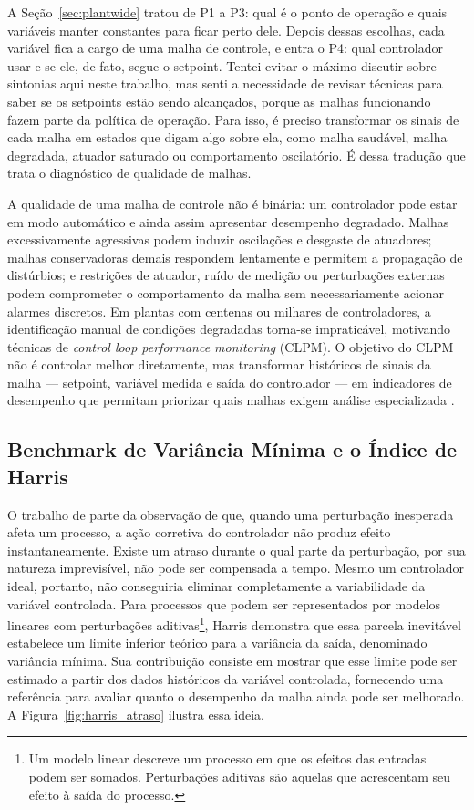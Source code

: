 A Seção~\ref{sec:plantwide} tratou de P1 a P3: qual é o ponto de operação e quais variáveis manter constantes para ficar perto dele. Depois dessas escolhas, cada variável fica a cargo de uma malha de controle, e entra o P4: qual controlador usar e se ele, de fato, segue o setpoint. Tentei evitar o máximo discutir sobre sintonias aqui neste trabalho, mas senti a necessidade de revisar técnicas para saber se os setpoints estão sendo alcançados, porque as malhas funcionando fazem parte da política de operação. Para isso, é preciso transformar os sinais de cada malha em estados que digam algo sobre ela, como malha saudável, malha degradada, atuador saturado ou comportamento oscilatório. É dessa tradução que trata o diagnóstico de qualidade de malhas.

A qualidade de uma malha de controle não é binária: um controlador pode estar em modo automático e ainda assim apresentar desempenho degradado. Malhas excessivamente agressivas podem induzir oscilações e desgaste de atuadores; malhas conservadoras demais respondem lentamente e permitem a propagação de distúrbios; e restrições de atuador, ruído de medição ou perturbações externas podem comprometer o comportamento da malha sem necessariamente acionar alarmes discretos. Em plantas com centenas ou milhares de controladores, a identificação manual de condições degradadas torna-se impraticável, motivando técnicas de \textit{control loop performance monitoring} (CLPM). O objetivo do CLPM não é controlar melhor diretamente, mas transformar históricos de sinais da malha --- setpoint, variável medida e saída do controlador --- em indicadores de desempenho que permitam priorizar quais malhas exigem análise especializada \cite{Bradu2018}.

\subsection{Benchmark de Variância Mínima e o Índice de Harris}

O trabalho de  parte da observação de que, quando uma perturbação inesperada afeta um processo, a ação corretiva do controlador não produz efeito instantaneamente. Existe um atraso durante o qual parte da perturbação, por sua natureza imprevisível, não pode ser compensada a tempo. Mesmo um controlador ideal, portanto, não conseguiria eliminar completamente a variabilidade da variável controlada. Para processos que podem ser representados por modelos lineares com perturbações aditivas\footnote{Um modelo linear descreve um processo em que os efeitos das entradas podem ser somados. Perturbações aditivas são aquelas que acrescentam seu efeito à saída do processo.}, Harris demonstra que essa parcela inevitável estabelece um limite inferior teórico para a variância da saída, denominado variância mínima. Sua contribuição consiste em mostrar que esse limite pode ser estimado a partir dos dados históricos da variável controlada, fornecendo uma referência para avaliar quanto o desempenho da malha ainda pode ser melhorado. A Figura~\ref{fig:harris_atraso} ilustra essa ideia.

